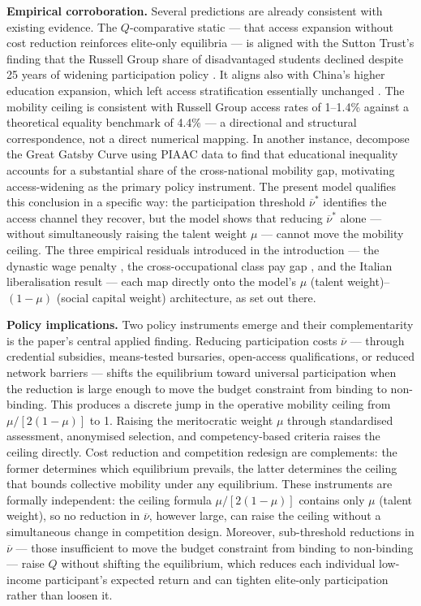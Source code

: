 \documentclass[
    oneside,
    fontsize=10pt,leqno]{article}
\begin{document}
\medskip
\noindent\textbf{Empirical corroboration.} Several predictions
are already consistent with existing evidence. The
$Q$-comparative static --- that access expansion without cost
reduction reinforces elite-only equilibria --- is aligned with the Sutton Trust's finding that the Russell Group share of
disadvantaged students declined despite 25 years of widening
participation policy \citep{SuttonTrust2023}. It aligns also with China's
higher education expansion, which left access stratification
essentially unchanged \citep{DingWuYangYe2021}. The mobility ceiling
is consistent with Russell Group access rates of 1--1.4\% against
a theoretical equality benchmark of 4.4\% --- a directional and
structural correspondence, not a direct numerical mapping. In another instance, \citet{GGCPiaac2015} decompose the Great Gatsby Curve using PIAAC data to find that educational inequality accounts for a substantial share of the cross-national mobility gap, motivating access-widening as the primary policy instrument. The present model qualifies this conclusion in a specific way: the participation threshold $\overline{\nu}^{*}$ identifies the access channel they recover, but the model shows that reducing $\overline{\nu}^{*}$  alone — without simultaneously raising the talent weight $\mu$ — cannot move the mobility ceiling. The three empirical residuals introduced in the introduction ---
the dynastic wage penalty \citep{LoBelloMorchio2022}, the
cross-occupational class pay gap \citep{LaurisonFriedman2016},
and the Italian liberalisation result \citep{MockettiRomaRubolino2022}
--- each map directly onto the model's $\mu$ (talent weight)--$(1-\mu)$ (social capital weight) architecture,
as set out there.

\medskip
\noindent\textbf{Policy implications.} Two policy instruments
emerge and their complementarity is the paper's central applied
finding. Reducing participation costs $\overline{\nu}$ --- through
credential subsidies, means-tested bursaries, open-access
qualifications, or reduced network barriers --- shifts the
equilibrium toward universal participation when the reduction is
large enough to move the budget constraint from binding to
non-binding. This produces a discrete jump in the operative
mobility ceiling from $\mu/[2(1-\mu)]$ to 1. Raising the
meritocratic weight $\mu$ through standardised assessment,
anonymised selection, and competency-based criteria raises the
ceiling directly. Cost reduction and competition redesign are
complements: the former determines which equilibrium prevails,
the latter determines the ceiling that bounds collective mobility
under any equilibrium. These instruments are formally independent:
the ceiling formula $\mu/[2(1-\mu)]$ contains only $\mu$ (talent weight), so no
reduction in $\overline{\nu}$, however large, can raise the ceiling
without a simultaneous change in competition design. Moreover,
sub-threshold reductions in $\overline{\nu}$ --- those insufficient
to move the budget constraint from binding to non-binding ---
raise $Q$ without shifting the equilibrium, which reduces each
individual low-income participant's expected return and can
tighten elite-only participation rather than loosen it.
\end{document}
